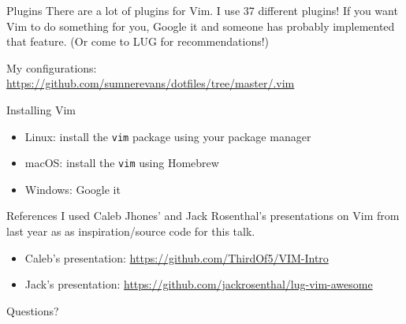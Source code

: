 \documentclass{lug}
\begin{document}
\begin{frame}{Plugins}
    There are a lot of plugins for Vim. I use 37 different plugins! If you want
    Vim to do something for you, Google it and someone has probably implemented
    that feature. (Or come to LUG for recommendations!)

    My configurations: \\
    \small\url{https://github.com/sumnerevans/dotfiles/tree/master/.vim}
\end{frame}

\begin{frame}{Installing Vim}
    \begin{itemize}
        \item Linux: install the \texttt{vim} package using your package manager
        \item macOS: install the \texttt{vim} using Homebrew
        \item Windows: Google it
    \end{itemize}
\end{frame}

\begin{frame}{References}
    I used Caleb Jhones' and Jack Rosenthal's presentations on Vim from last
    year as as inspiration/source code for this talk.
    \begin{itemize}
        \item Caleb's presentation: \url{https://github.com/ThirdOf5/VIM-Intro}
        \item Jack's presentation: \url{https://github.com/jackrosenthal/lug-vim-awesome}
    \end{itemize}
\end{frame}

\begin{frame}[standout]
    \Huge
    Questions?
\end{frame}
\end{document}
